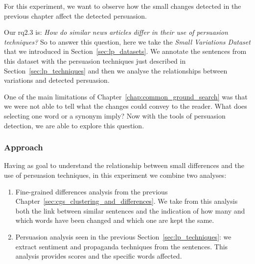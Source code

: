 

For this experiment, we want to observe how the small changes detected in the previous chapter affect the detected persuasion.

Our \acrshort{rq}2.3 is: \emph{How do similar news articles differ in their use of persuasion techniques?}
So to answer this question, here we take
the \emph{Small Variations Dataset} that we introduced in Section~\ref{sec:lp_datasets}.
We annotate the sentences from this dataset with the persuasion techniques just described in Section~\ref{sec:lp_techniques} and then we analyse the relationships between variations and detected persuasion.

One of the main limitations of Chapter~\ref{chap:common_ground_search} was that we were not able to tell what the changes could convey to the reader. What does selecting one word or a synonym imply? Now with the tools of persuasion detection, we are able to explore this question.




\subsubsection{Approach}
\label{ssec:lp_relationship_small_variations_appr}

Having as goal to understand the relationship between small differences
and the use of persuasion techniques, in this experiment we combine two analyses:
\begin{enumerate}
    \item Fine-grained differences analysis from the previous Chapter~\ref{sec:cgs_clustering_and_differences}. We take from this analysis both the link between similar sentences and the indication of how many and which words have been changed and which one are kept the same.
    \item Persuasion analysis seen in the previous Section~\ref{sec:lp_techniques}: we extract sentiment and propaganda techniques from the sentences. This analysis provides scores and the specific words affected.
\end{enumerate}

